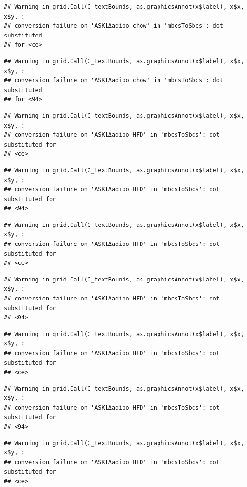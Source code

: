 \documentclass[]{book}
\begin{document}
\begin{verbatim}
## Warning in grid.Call(C_textBounds, as.graphicsAnnot(x$label), x$x, x$y, :
## conversion failure on 'ASK1Δadipo chow' in 'mbcsToSbcs': dot substituted
## for <ce>
\end{verbatim}

\begin{verbatim}
## Warning in grid.Call(C_textBounds, as.graphicsAnnot(x$label), x$x, x$y, :
## conversion failure on 'ASK1Δadipo chow' in 'mbcsToSbcs': dot substituted
## for <94>
\end{verbatim}

\begin{verbatim}
## Warning in grid.Call(C_textBounds, as.graphicsAnnot(x$label), x$x, x$y, :
## conversion failure on 'ASK1Δadipo HFD' in 'mbcsToSbcs': dot substituted for
## <ce>
\end{verbatim}

\begin{verbatim}
## Warning in grid.Call(C_textBounds, as.graphicsAnnot(x$label), x$x, x$y, :
## conversion failure on 'ASK1Δadipo HFD' in 'mbcsToSbcs': dot substituted for
## <94>
\end{verbatim}

\begin{verbatim}
## Warning in grid.Call(C_textBounds, as.graphicsAnnot(x$label), x$x, x$y, :
## conversion failure on 'ASK1Δadipo HFD' in 'mbcsToSbcs': dot substituted for
## <ce>
\end{verbatim}

\begin{verbatim}
## Warning in grid.Call(C_textBounds, as.graphicsAnnot(x$label), x$x, x$y, :
## conversion failure on 'ASK1Δadipo HFD' in 'mbcsToSbcs': dot substituted for
## <94>
\end{verbatim}

\begin{verbatim}
## Warning in grid.Call(C_textBounds, as.graphicsAnnot(x$label), x$x, x$y, :
## conversion failure on 'ASK1Δadipo HFD' in 'mbcsToSbcs': dot substituted for
## <ce>
\end{verbatim}

\begin{verbatim}
## Warning in grid.Call(C_textBounds, as.graphicsAnnot(x$label), x$x, x$y, :
## conversion failure on 'ASK1Δadipo HFD' in 'mbcsToSbcs': dot substituted for
## <94>
\end{verbatim}

\begin{verbatim}
## Warning in grid.Call(C_textBounds, as.graphicsAnnot(x$label), x$x, x$y, :
## conversion failure on 'ASK1Δadipo HFD' in 'mbcsToSbcs': dot substituted for
## <ce>
\end{verbatim}
\end{document}
